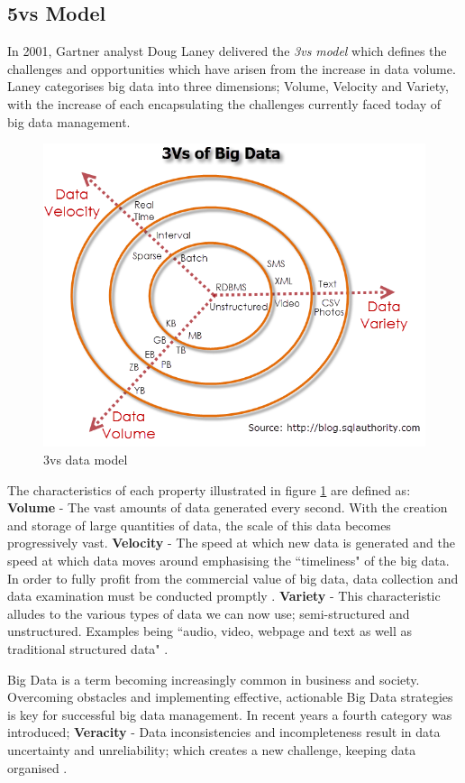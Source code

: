 \subsection{5vs Model}\label{5vs}
In 2001, Gartner analyst Doug Laney delivered the \textit{3vs model} which defines the challenges and opportunities which have arisen from the increase in data volume. Laney categorises big data into three dimensions; Volume, Velocity and Variety, with the increase of each encapsulating the challenges currently faced today of big data management. \begin{figure}[h]\begin{center}\includegraphics[width=0.8\linewidth]{images/3vs}\caption{3vs data model}\label{fig:3vs}\end{center}\end{figure}
\parindent 0pt
The characteristics of each property illustrated in figure \ref{fig:3vs} are defined as: \textbf{Volume} - The vast amounts of data generated every second. With the creation and storage of large quantities of data, the scale of this data becomes progressively vast. \textbf{Velocity} -  The speed at which new data is generated and the speed at which data moves around emphasising the ``timeliness" of the big data. In order to fully profit from the commercial value of big data, data collection and data examination must be conducted promptly . \textbf{Variety} - This characteristic alludes to the various types of data we can now use; semi-structured and unstructured. Examples being ``audio, video, webpage and text as well as traditional structured data" \cite{bigdata}.

\parindent 15pt Big Data is a term becoming increasingly common in business and society. Overcoming obstacles and implementing effective, actionable Big Data strategies is key for successful big data management. In recent years a fourth category was introduced; \textbf{Veracity} - Data inconsistencies and incompleteness result in data uncertainty and unreliability; which creates a new challenge, keeping data organised \cite{bigdata}.

